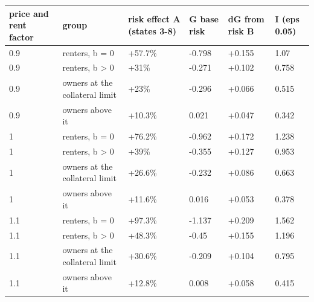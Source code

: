 \begingroup\small
\setlength{\tabcolsep}{3pt}
\renewcommand{\arraystretch}{1.04}
\begin{tabularx}{\linewidth}{XXXXXX}
\toprule
price and rent factor & group & risk effect A (states 3-8) & G base risk & dG from risk B & I (eps 0.05) \\
\midrule
0.9 & renters, b = 0 & +57.7\% & -0.798 & +0.155 & 1.07 \\
0.9 & renters, b \textgreater{} 0 & +31\% & -0.271 & +0.102 & 0.758 \\
0.9 & owners at the collateral limit & +23\% & -0.296 & +0.066 & 0.515 \\
0.9 & owners above it & +10.3\% & 0.021 & +0.047 & 0.342 \\
1 & renters, b = 0 & +76.2\% & -0.962 & +0.172 & 1.238 \\
1 & renters, b \textgreater{} 0 & +39\% & -0.355 & +0.127 & 0.953 \\
1 & owners at the collateral limit & +26.6\% & -0.232 & +0.086 & 0.663 \\
1 & owners above it & +11.6\% & 0.016 & +0.053 & 0.378 \\
1.1 & renters, b = 0 & +97.3\% & -1.137 & +0.209 & 1.562 \\
1.1 & renters, b \textgreater{} 0 & +48.3\% & -0.45 & +0.155 & 1.196 \\
1.1 & owners at the collateral limit & +30.6\% & -0.209 & +0.104 & 0.795 \\
1.1 & owners above it & +12.8\% & 0.008 & +0.058 & 0.415 \\
\bottomrule
\end{tabularx}
\endgroup
